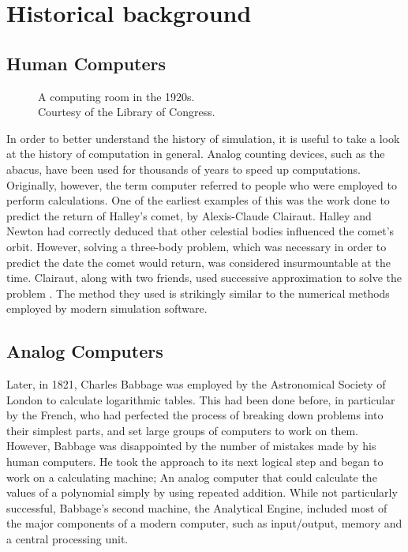 \documentclass[\rootfolder/main.tex]{subfiles}
\begin{document}
\chapter{Historical background} %

\label{ch:background} %

\section{Human Computers}

\begin{wrapfigure}{R}{0.5\columnwidth}
    \caption[A computing room in the 1920s.]
            {A computing room in the 1920s. \\ Courtesy of the Library of Congress\label{fig:tabulatingroom}.}
\end{wrapfigure}

In order to better understand the history of simulation, it is useful to take a look at the history of computation in general.
Analog counting devices, such as the abacus, have been used for thousands of years to speed up computations.
Originally, however, the term computer referred to people who were employed to perform calculations.
One of the earliest examples of this was the work done to predict the return of Halley's comet, by Alexis-Claude Clairaut.
Halley and Newton had correctly deduced that other celestial bodies influenced the comet's orbit.
However, solving a three-body problem, which was necessary in order to predict the date the comet would return, was considered insurmountable at the time.
Clairaut, along with two friends, used successive approximation to solve the problem \cite{wilson1993}.
The method they used is strikingly similar to the numerical methods employed by modern simulation software.

\section{Analog Computers}

Later, in 1821, Charles Babbage was employed by the Astronomical Society of London to calculate logarithmic tables.
This had been done before, in particular by the French, who had perfected the process of breaking down problems into their simplest parts, and set large groups of computers to work on them.
However, Babbage was disappointed by the number of mistakes made by his human computers.
He took the approach to its next logical step and began to work on a calculating machine; An analog computer that could calculate the values of a polynomial simply by using repeated addition.
While not particularly successful, Babbage's second machine, the Analytical Engine, included most of the major components of a modern computer, such as input/output, memory and a central processing unit.
\end{document}
